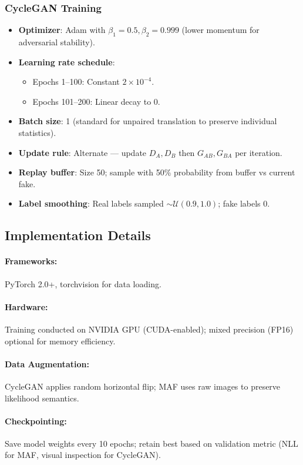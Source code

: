 \documentclass[conference]{IEEEtran}
\begin{document}
\subsubsection{CycleGAN Training}
\begin{itemize}
\item \textbf{Optimizer}: Adam with $\beta_1=0.5, \beta_2=0.999$ (lower momentum for adversarial stability).
\item \textbf{Learning rate schedule}: 
  \begin{itemize}
  \item Epochs 1–100: Constant $2 \times 10^{-4}$.
  \item Epochs 101–200: Linear decay to 0.
  \end{itemize}
\item \textbf{Batch size}: 1 (standard for unpaired translation to preserve individual statistics).
\item \textbf{Update rule}: Alternate — update $D_A, D_B$ then $G_{AB}, G_{BA}$ per iteration.
\item \textbf{Replay buffer}: Size 50; sample with 50\% probability from buffer vs current fake.
\item \textbf{Label smoothing}: Real labels sampled $\sim \mathcal{U}(0.9, 1.0)$; fake labels 0.
\end{itemize}

\subsection{Implementation Details}
\paragraph{Frameworks:} PyTorch 2.0+, torchvision for data loading.
\paragraph{Hardware:} Training conducted on NVIDIA GPU (CUDA-enabled); mixed precision (FP16) optional for memory efficiency.
\paragraph{Data Augmentation:} CycleGAN applies random horizontal flip; MAF uses raw images to preserve likelihood semantics.
\paragraph{Checkpointing:} Save model weights every 10 epochs; retain best based on validation metric (NLL for MAF, visual inspection for CycleGAN).
\end{document}

